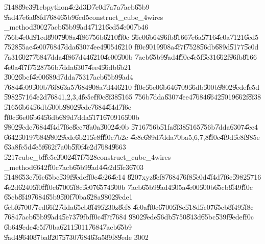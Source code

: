 \U{5148}\U{89e3}\U{91cb}python\U{4e2d}3D\U{7c0d}\U{7a7a}\U{7acb}\U{65b9}%
\U{9ad4}\U{7e6a}\U{88fd}\U{7684}\U{65b9}\U{6cd5}construct\_cube\_4wires%
\_method\U{3002}\U{7acb}\U{65b9}\U{9ad4}\U{7121}\U{6cd5}\U{4e00}\U{7b46}%
\U{756b}\U{4e0d}\U{91cd}\U{8907}\U{908a}\U{4f86}\U{756b}\U{6210}\U{ff0c}%
\U{56e0}\U{6b64}\U{96fb}\U{8166}\U{7e6a}\U{5716}\U{4e0a}\U{7121}\U{6cd5}%
\U{7528}\U{55ae}\U{4e00}\U{7684}\U{7dda}\U{6307}\U{4ee4}\U{9054}\U{6210}%
\U{ff0c}\U{9019}\U{908a}\U{4f7f}\U{7528}\U{56db}\U{689d}\U{5177}\U{5c0d}%
\U{7a31}\U{6027}\U{7684}\U{7dda}\U{4f86}\U{7d44}\U{6210}\U{4e00}\U{500b}%
\U{7acb}\U{65b9}\U{9ad4}\U{ff0c}\U{4e5f}\U{5c31}\U{662f}\U{96fb}\U{8166}%
\U{4e0a}\U{4f7f}\U{7528}\U{756b}\U{7dda}\U{6307}\U{4ee4}\U{56db}\U{6b21}%
\U{3002}\U{6bcf}\U{4e00}\U{689d}\U{7dda}\U{7531}\U{7acb}\U{65b9}\U{9ad4}%
\U{7684}\U{4e09}\U{500b}\U{76f8}\U{63a5}\U{7684}\U{908a}\U{7d44}\U{6210}%
\U{ff0c}\U{56e0}\U{6b64}\U{6709}\U{56db}\U{500b}\U{9802}\U{9ede}\U{fe5d}%
\U{5982}\U{5716}\U{4e2d}\U{7684}1,2,3,4\U{fe5e}\U{ff0c}\U{8f38}\U{5165}%
\U{756b}\U{7dda}\U{6307}\U{4ee4}\U{7684}\U{6642}\U{5019}\U{662f}\U{8f38}%
\U{5165}\U{6b64}\U{56db}\U{500b}\U{9802}\U{9ede}\U{7684}\U{4f4d}\U{7f6e}%
\U{ff0c}\U{56e0}\U{6b64}\U{56db}\U{689d}\U{7dda}\U{5171}\U{6709}16\U{500b}%
\U{9802}\U{9ede}\U{7684}\U{4f4d}\U{7f6e}\U{8cc7}\U{8a0a}\U{3002}\U{4e0b}%
\U{5716}\U{756b}\U{51fa}\U{8f38}\U{5165}\U{756b}\U{7dda}\U{6307}\U{4ee4}%
\U{6642}\U{5019}\U{7684}\U{9802}\U{9ede}\U{6b21}\U{5e8f}\U{ff0c}\U{7b2c}%
\U{4e8c}\U{689d}\U{7dda}\U{70ba}5,6,7,8\U{ff0c}\U{4f9d}\U{5e8f}\U{985e}%
\U{63a8}\U{fe5d}\U{4e5f}\U{662f}\U{7a0b}\U{5f0f}\U{4e2d}\U{7684}\U{9663}%
\U{5217}cube\_bf\U{fe5e}\U{3002}\U{4f7f}\U{7528}construct\_cube\_4wires%
\_method\U{6642}\U{ff0c}\U{7acb}\U{65b9}\U{9ad4}\U{4e2d}\U{5fc3}\U{6703}%
\U{5148}\U{653e}\U{7f6e}\U{65bc}\U{539f}\U{9ede}\U{ff0c}\U{4e26}\U{4e14}%
\U{8207}xyz\U{8ef8}\U{7684}\U{76f8}\U{5c0d}\U{4f4d}\U{7f6e}\U{5982}\U{5716}%
\U{4e2d}\U{6240}\U{5f0f}\U{ff0c}\U{6700}\U{5f8c}\U{5c07}\U{6574}\U{500b}%
\U{7acb}\U{65b9}\U{9ad4}\U{505a}\U{4e00}\U{500b}\U{65cb}\U{8f49}\U{ff0c}%
\U{65cb}\U{8f49}\U{7684}\U{65b9}\U{5f0f}\U{70ba}\U{628a}\U{9802}\U{9ede}1%
\U{6cbf}\U{6700}\U{77ed}\U{66f2}\U{7dda}\U{65cb}\U{8f49}\U{5230}z\U{8ef8}%
\U{4e0a}\U{ff0c}\U{6700}\U{5f8c}\U{518d}\U{5c07}\U{65cb}\U{8f49}\U{5f8c}%
\U{7684}\U{7acb}\U{65b9}\U{9ad4}\U{5e73}\U{79fb}\U{ff0c}\U{4f7f}\U{7684}%
\U{9802}\U{9ede}\U{56db}\U{5750}\U{843d}\U{65bc}\U{539f}\U{9ede}\U{ff0c}%
\U{6b64}\U{9ede}\U{4e5f}\U{70ba}\U{6211}\U{5011}\U{7684}\U{7acb}\U{65b9}%
\U{9ad4}\U{9640}\U{87ba}\U{8207}\U{5730}\U{7684}\U{63a5}\U{89f8}\U{9ede}%
\U{3002}

